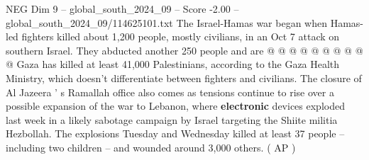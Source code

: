 \begin{textsample}{NEG Dim 9 – global\_south\_2024\_09 – Score -2.00 – global\_south\_2024\_09/114625101.txt}
The Israel-Hamas war began when Hamas-led fighters killed about 1,200 people, mostly civilians, in an Oct 7 attack on southern Israel.
They abducted another 250 people and are @ @ @ @ @ @ @ @ @ @ Gaza has killed at least 41,000 Palestinians, according to the Gaza Health Ministry, which doesn't differentiate between fighters and civilians.
The closure of Al Jazeera ' s Ramallah office also comes as tensions continue to rise over a possible expansion of the war to Lebanon, where \textbf{electronic} devices exploded last week in a likely sabotage campaign by Israel targeting the Shiite militia Hezbollah.
The explosions Tuesday and Wednesday killed at least 37 people -- including two children -- and wounded around 3,000 others. ( AP )

\end{textsample}

